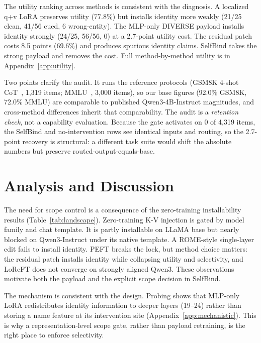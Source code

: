 \documentclass[11pt]{article}
\begin{document}
The utility ranking across methods is consistent with the diagnosis. A localized q+v LoRA preserves utility (77.8\%) but installs identity more weakly (21/25 clean, 41/56 cued, 6 wrong-entity). The MLP-only DIVERSE payload installs identity strongly (24/25, 56/56, 0) at a 2.7-point utility cost. The residual patch costs 8.5 points (69.6\%) and produces spurious identity claims. SelfBind takes the strong payload and removes the cost. Full method-by-method utility is in Appendix~\ref{app:utility}.

Two points clarify the audit. It runs the reference protocols (GSM8K 4-shot CoT~\cite{cobbe2021gsm8k}, 1,319 items; MMLU~\cite{hendrycks2021mmlu}, 3,000 items), so our base figures (92.0\% GSM8K, 72.0\% MMLU) are comparable to published Qwen3-4B-Instruct magnitudes, and cross-method differences inherit that comparability. The audit is a \emph{retention check}, not a capability evaluation. Because the gate activates on 0 of 4,319 items, the SelfBind and no-intervention rows see identical inputs and routing, so the 2.7-point recovery is structural: a different task suite would shift the absolute numbers but preserve routed-output-equals-base.



\section{Analysis and Discussion}
\label{sec:analysis}

The need for scope control is a consequence of the zero-training installability results (Table~\ref{tab:landscape}). Zero-training K-V injection is gated by model family and chat template. It is partly installable on LLaMA base but nearly blocked on Qwen3-Instruct under its native template. A ROME-style single-layer edit fails to install identity. PEFT breaks the lock, but method choice matters: the residual patch installs identity while collapsing utility and selectivity, and LoReFT does not converge on strongly aligned Qwen3. These observations motivate both the payload and the explicit scope decision in SelfBind.



The mechanism is consistent with the design. Probing shows that MLP-only LoRA redistributes identity information to deeper layers (19--24) rather than storing a name feature at its intervention site (Appendix~\ref{app:mechanistic}). This is why a representation-level scope gate, rather than payload retraining, is the right place to enforce selectivity.
\end{document}

